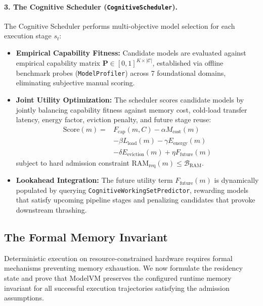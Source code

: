 \paragraph{3. The Cognitive Scheduler (\texttt{CognitiveScheduler}).}
The Cognitive Scheduler performs multi-objective model selection for each execution stage $s_t$:
\begin{itemize}
    \item \textbf{Empirical Capability Fitness:} Candidate models are evaluated against empirical capability matrix $\mathbf{P} \in [0, 1]^{K \times |\mathcal{C}|}$, established via offline benchmark probes (\texttt{ModelProfiler}) across 7 foundational domains, eliminating subjective manual scoring.
    \item \textbf{Joint Utility Optimization:} The scheduler scores candidate models by jointly balancing capability fitness against memory cost, cold-load transfer latency, energy factor, eviction penalty, and future stage reuse:
    \begin{equation}
    \begin{aligned}
    \text{Score}(m) = & F_{\text{cap}}(m, C) - \alpha M_{\text{cost}}(m) \\
                      & - \beta L_{\text{load}}(m) - \gamma E_{\text{energy}}(m) \\
                      & - \delta E_{\text{eviction}}(m) + \eta F_{\text{future}}(m)
    \end{aligned}
    \end{equation}
    subject to hard admission constraint $\text{RAM}_{\text{req}}(m) \le \mathcal{B}_{\text{RAM}}$.
    \item \textbf{Lookahead Integration:} The future utility term $F_{\text{future}}(m)$ is dynamically populated by querying \texttt{CognitiveWorkingSetPredictor}, rewarding models that satisfy upcoming pipeline stages and penalizing candidates that provoke downstream thrashing.
\end{itemize}

\subsection{The Formal Memory Invariant}
\label{sec:memory_invariant}

Deterministic execution on resource-constrained hardware requires formal mechanisms preventing memory exhaustion. We now formulate the residency state and prove that ModelVM preserves the configured runtime memory invariant for all successful execution trajectories satisfying the admission assumptions.

